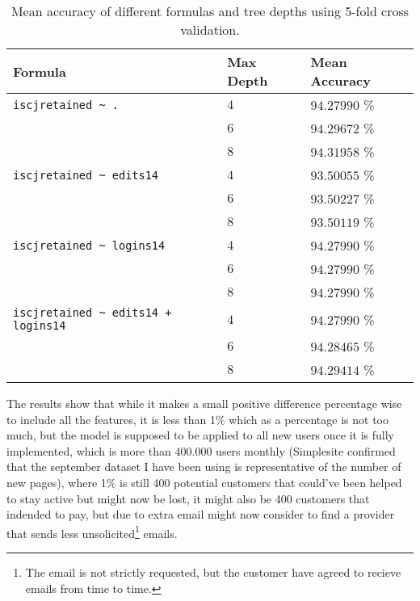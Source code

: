 \begin{table}[H]
    \centering
    \begin{tabular}{l|l|l}
        \textbf{Formula}                              & \textbf{Max Depth} & \textbf{Mean Accuracy} \\ \hline
        \texttt{iscjretained \~{} .}                  & $4$                & $94.27990$ \%          \\
                                                      & $6$                & $94.29672$ \%          \\ %
                                                      & $8$                & $94.31958$ \%          \\ \hline %
        \texttt{iscjretained \~{} edits14}            & $4$                & $93.50055$ \%          \\
                                                      & $6$                & $93.50227$ \%          \\
                                                      & $8$                & $93.50119$ \%          \\ \hline
        \texttt{iscjretained \~{} logins14}           & $4$                & $94.27990$ \%          \\
                                                      & $6$                & $94.27990$ \%          \\
                                                      & $8$                & $94.27990$ \%          \\ \hline
        \texttt{iscjretained \~{} edits14 + logins14} & $4$                & $94.27990$ \%          \\
                                                      & $6$                & $94.28465$ \%          \\
                                                      & $8$                & $94.29414$ \%
    \end{tabular}
    \caption{Mean accuracy of different formulas and tree depths using 5-fold cross
        validation.}
    \label{tab:formulacompare}
\end{table}

The results show that while it makes a small positive difference percentage wise
to include all the features, it is less than 1\% which as a percentage is not
too much, but the model is supposed to be applied to all new users once it is
fully implemented, which is more than 400.000 users monthly (Simplesite
confirmed that the september dataset I have been using is representative of the
number of new pages), where 1\% is still 400 potential customers that could've
been helped to stay active but might now be lost, it might also be 400 customers
that indended to pay, but due to extra email might now consider to find a
provider that sends less unsolicited\footnote{The email is not strictly
requested, but the customer have agreed to recieve emails from time to time.}
emails.

